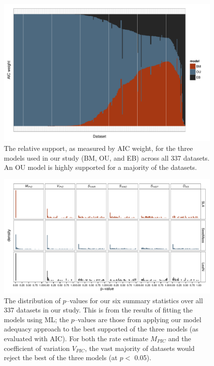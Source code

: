 \documentclass[a4paper,12pt]{article}
\begin{document}
\begin{figure}[p]
  \centering
  \includegraphics[angle=90, origin=c, scale=0.8]{figs/AIC-support}
  \caption{The relative support, as measured by AIC weight, for the three models used in our study (BM, OU, and EB) across all 337 datasets. An OU model is highly supported for a majority of the datasets.}
  \label{fig:aic-support}
\end{figure}

\begin{figure}[p]
  \centering
  \includegraphics[angle=90, origin=c, scale=0.85]{figs/pvalue-hist-ML}
  \caption{The distribution of $p$--values for our six summary statistics over all 337 datasets in our study. This is from the results of fitting the models using ML; the $p$--values are those from applying our model adequacy approach to the best supported of the three models (as evaluated with AIC). For both the rate estimate $M_{PIC}$ and the coefficient of variation $V_{PIC}$, the vast majority of datasets would reject the best of the three models (at $p<$ 0.05).}
  \label{fig:pvalues}
\end{figure}
\end{document}
